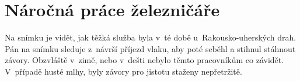 
\chapter{Náročná práce železničáře}


Na snímku je vidět, jak těžká služba byla v~té době u~Rakousko-uherských drah.
Pán na snímku sleduje z~návrší příjezd vlaku, aby poté seběhl a stihnul
stáhnout závory. Obzvláště v~zimě, nebo v~dešti nebylo těmto pracovníkům co
závidět. V~případě husté mlhy, byly závory pro jistotu staženy nepřetržitě.

